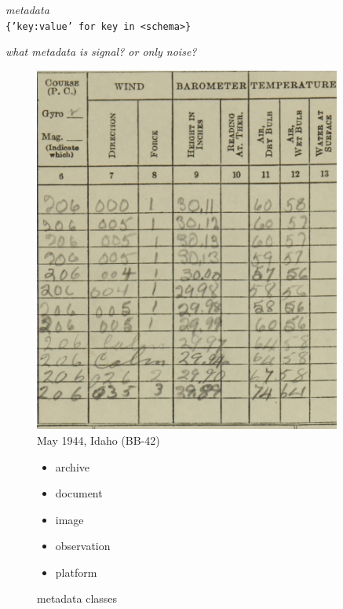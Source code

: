 \documentclass{beamer}
\begin{document}
\begin{frame}[fragile]
  \begin{center}
    \textit{metadata}\\
    \texttt{\{'key:value' for key in <schema>\}}
  \end{center}

    \textit{what metadata is signal? or only noise?}

\begin{minipage}[t]{0.5\linewidth}
    \begin{figure}
        \includegraphics[width=0.9\textwidth]{img/idaho-1944}
        \caption{
            May 1944, Idaho (BB-42)
        }
    \end{figure}
\end{minipage}
\begin{minipage}[t]{0.45\linewidth}
    \begin{figure}
        \begin{itemize}
            \item archive
            \item document
            \item image
            \item observation
            \item platform
        \end{itemize}
        \caption{metadata classes}
    \end{figure}
\end{minipage}
\end{frame}
\end{document}
